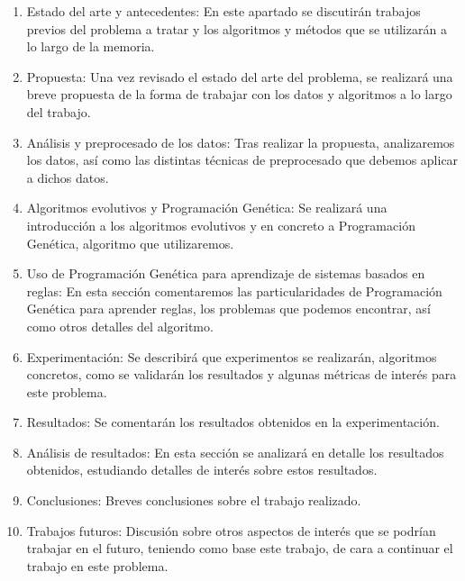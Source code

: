 \begin{enumerate}
	\item Estado del arte y antecedentes: En este apartado se discutirán trabajos previos del problema a tratar y los algoritmos y métodos que se utilizarán a lo largo de la memoria.
	\item Propuesta: Una vez revisado el estado del arte del problema, se realizará una breve propuesta de la forma de trabajar con los datos y algoritmos a lo largo del trabajo.
	\item Análisis y preprocesado de los datos: Tras realizar la propuesta, analizaremos los datos, así como las distintas técnicas de preprocesado que debemos aplicar a dichos datos.
	\item Algoritmos evolutivos y Programación Genética: Se realizará una introducción a los algoritmos evolutivos y en concreto a Programación Genética, algoritmo que utilizaremos.
	\item Uso de Programación Genética para aprendizaje de sistemas basados en reglas: En esta sección comentaremos las particularidades de Programación Genética para aprender reglas, los problemas que podemos encontrar, así como otros detalles del algoritmo.
	\item Experimentación: Se describirá que experimentos se realizarán, algoritmos concretos, como se validarán los resultados y algunas métricas de interés para este problema.
	\item Resultados: Se comentarán los resultados obtenidos en la experimentación.
	\item Análisis de resultados: En esta sección se analizará en detalle los resultados obtenidos, estudiando detalles de interés sobre estos resultados.
	\item Conclusiones: Breves conclusiones sobre el trabajo realizado.
	\item Trabajos futuros: Discusión sobre otros aspectos de interés que se podrían trabajar en el futuro, teniendo como base este trabajo, de cara a continuar el trabajo en este problema.
\end{enumerate}



\newpage
